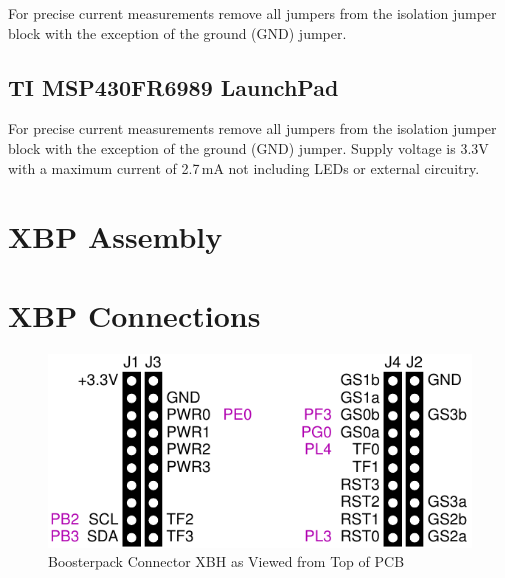 \documentclass{article}
\begin{document}
For precise current measurements remove all jumpers from the isolation jumper block 
with the exception of the ground (GND) jumper. 

\subsection{TI MSP430FR6989 LaunchPad\texttrademark}

For precise current measurements remove all jumpers from the isolation jumper block 
with the exception of the ground (GND) jumper. Supply voltage is 3.3V with a maximum 
current of 2.7\,mA not including LEDs or external circuitry.

\section{XBP Assembly}

\section{XBP Connections}

\begin{figure}[ht]
  \begin{center}
    \includegraphics[scale=1]{figures/xbp-xbh}
    \caption{Boosterpack Connector XBH as Viewed from Top of PCB}
  \end{center}
\end{figure}
\end{document}
